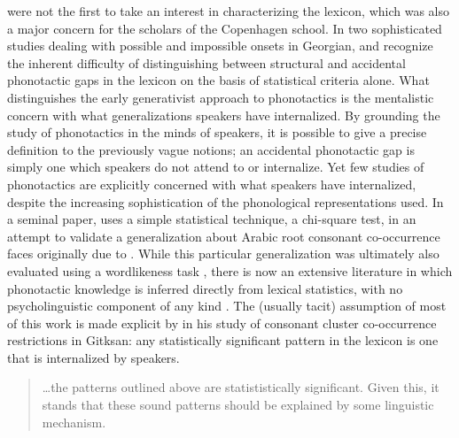 \citeauthor{Chomsky1965} were not the first to take an interest in characterizing the lexicon, which was also a major concern for the scholars of the Copenhagen school. In two sophisticated studies dealing with possible and impossible onsets in Georgian, \citet{Fischer-Jorgensen1952} and \citet{Vogt1954} recognize the inherent difficulty of distinguishing between structural and accidental phonotactic gaps in the lexicon on the basis of statistical criteria alone. What distinguishes the early generativist approach to phonotactics is the mentalistic concern with what generalizations speakers have internalized. By grounding the study of phonotactics in the minds of speakers, it is possible to give a precise definition to the previously vague notions; an accidental phonotactic gap is simply one which speakers do not attend to or internalize. Yet few studies of phonotactics are explicitly concerned with what speakers have internalized, despite the increasing sophistication of the phonological representations used. In a seminal paper, \citet{McCarthy1988} uses a simple statistical technique, a chi-square test, in an attempt to validate a generalization about Arabic root consonant co-occurrence faces originally due to \citet{Greenberg1950}. While this particular generalization was ultimately also evaluated using a wordlikeness task \citep{Frisch2004}, there is now an extensive literature in which phonotactic knowledge is inferred directly from lexical statistics, with no psycholinguistic component of any kind \citep[e.g.,][]{Mester1988,Padgett1992,Padgett1995,Berkley1994b,Berkley1994a,Berkley2000,Buckley1997,MacEachern1999,Kinney2005,Kawahara2006,Martin2007,Martin2011,Pozdniakov2007,Anttila2008,Coetzee2008a,Dmitrieva2008a,Dmitrieva2008b,Graff2011}. The (usually tacit) assumption of most of this work is made explicit by \citet{Brown2010} in his study of consonant cluster co-occurrence restrictions in Gitksan: any statistically significant pattern in the lexicon is one that is internalized by speakers. 

\begin{quote}
\ldots{}the patterns outlined above are statististically significant. Given this, it stands that these sound patterns should be explained by some linguistic mechanism. \citep[][48]{Brown2010}
\end{quote}

